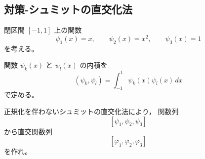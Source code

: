 \subsection{対策-シュミットの直交化法}
\begin{exercise}[シュミットの直交化法]
	閉区間 \([-1,1]\) 上の関数
	\[
	\psi_1(x)=x,\qquad
	\psi_2(x)=x^2,\qquad
	\psi_3(x)=1
	\]
	を考える。
	
	関数 \(\psi_k(x)\) と \(\psi_l(x)\) の内積を
	\[
	(\psi_k,\psi_l)
	=
	\int_{-1}^{1}\psi_k(x)\psi_l(x)\,dx
	\]
	で定める。
	
	正規化を伴わないシュミットの直交化法により，
	関数列
	\[
	[\psi_1,\psi_2,\psi_3]
	\]
	から直交関数列
	\[
	[\varphi_1,\varphi_2,\varphi_3]
	\]
	を作れ。
\end{exercise}

